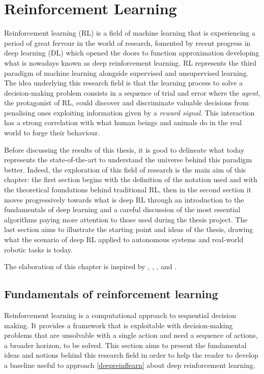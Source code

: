 \chapter{Reinforcement Learning} \label{ch:ch2}

Reinforcement learning (RL) is a field of machine learning that is experiencing a period of great fervour in the world of research, fomented by recent progress in deep learning (DL) which opened the doors to function approximation developing what is nowadays known as deep reinforcement learning.
RL represents the third paradigm of machine learning alongside supervised and unsupervised learning.
The idea underlying this research field is that the learning process to solve a decision-making problem consists in a sequence of trial and error where the \textit{agent}, the protagonist of RL, could discover and discriminate valuable decisions from penalising ones exploiting information given by a \textit{reward signal}.
This interaction has a strong correlation with what human beings and animals do in the real world to forge their behaviour.

Before discussing the results of this thesis, it is good to delineate what today represents the state-of-the-art to understand the universe behind this paradigm better.
Indeed, the exploration of this field of research is the main aim of this chapter: the first section begins with the definition of the notation used and with the theoretical foundations behind traditional RL, then in the second section it moves progressively towards what is deep RL through an introduction to the fundamentals of deep learning and a careful discussion of the most essential algorithms paying more attention to those used during the thesis project.
The last section aims to illustrate the starting point and ideas of the thesis, drawing what the scenario of deep RL applied to autonomous systems and real-world robotic tasks is today.

The elaboration of this chapter is inspired by \cite{silver2015lectures}, \cite{sutton2018reinforcement}, \cite{openai2018spinningup}, \cite{lapan2018deep} and \cite{franccois2018introduction}.

\section{Fundamentals of reinforcement learning} \label{fundreinflearn}

Reinforcement learning is a computational approach to sequential decision making.
It provides a framework that is exploitable with decision-making problems that are unsolvable with a single action and need a sequence of actions, a broader horizon, to be solved.
This section aims to present the fundamental ideas and notions behind this research field in order to help the reader to develop a baseline useful to approach \vref{deepreinflearn} about deep reinforcement learning.


